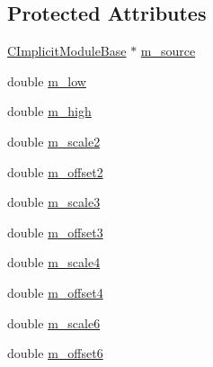 \subsection*{Protected Attributes}
\begin{DoxyCompactItemize}
\item 
\hyperlink{classanl_1_1CImplicitModuleBase}{CImplicitModuleBase} $\ast$ \hyperlink{classanl_1_1CImplicitAutoCorrect_af44394b98ab6814aadf30964a9766c1f}{m\_\-source}
\item 
double \hyperlink{classanl_1_1CImplicitAutoCorrect_a97c34f523032d1747a4b7ebb139af4fb}{m\_\-low}
\item 
double \hyperlink{classanl_1_1CImplicitAutoCorrect_a4ab85eba8360d883be29e031748b72d5}{m\_\-high}
\item 
double \hyperlink{classanl_1_1CImplicitAutoCorrect_aa6dbf4271267f06689fea89f6c5372f2}{m\_\-scale2}
\item 
double \hyperlink{classanl_1_1CImplicitAutoCorrect_a6dbc67de3f6fe62fac4438cc51db9fbe}{m\_\-offset2}
\item 
double \hyperlink{classanl_1_1CImplicitAutoCorrect_ab52a888f5fd8fad6b8f33e57f3217a6c}{m\_\-scale3}
\item 
double \hyperlink{classanl_1_1CImplicitAutoCorrect_a278dd029b2527c063e87b2ed64aad568}{m\_\-offset3}
\item 
double \hyperlink{classanl_1_1CImplicitAutoCorrect_a6274318f027640bfae30c8c0f23b4d94}{m\_\-scale4}
\item 
double \hyperlink{classanl_1_1CImplicitAutoCorrect_afe4f11207de8b86f72ce1914e151636f}{m\_\-offset4}
\item 
double \hyperlink{classanl_1_1CImplicitAutoCorrect_aba696caa637c56a234a84d6ab1daf141}{m\_\-scale6}
\item 
double \hyperlink{classanl_1_1CImplicitAutoCorrect_a3ed374e5fe2e2b6bc24ddadce4a1cd5c}{m\_\-offset6}
\end{DoxyCompactItemize}


